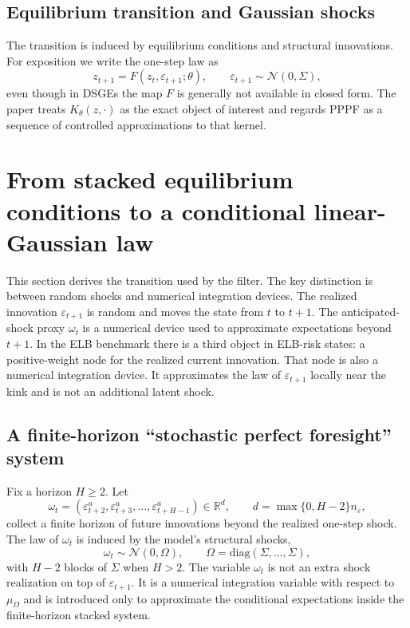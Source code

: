 \documentclass[11pt]{article}
\theoremstyle{remark}
\newcommand{\R}{\mathbb{R}}
\begin{document}
\subsection{Equilibrium transition and Gaussian shocks}

The transition is induced by equilibrium conditions and structural innovations.
For exposition we write the one-step law as
\begin{equation}
z_{t+1} = F(z_t,\varepsilon_{t+1};\theta),\qquad \varepsilon_{t+1}\sim \mathcal{N}(0,\Sigma),
\label{eq:true_transition}
\end{equation}
even though in DSGEs the map $F$ is generally not available in closed form.
The paper treats $K_\theta(z,\cdot)$ as the exact object of interest and regards PPPF as a sequence of controlled approximations to that kernel.

\section{From stacked equilibrium conditions to a conditional linear-Gaussian law}
\label{sec:cond_lg}

This section derives the transition used by the filter.
The key distinction is between random shocks and numerical integration devices.
The realized innovation $\varepsilon_{t+1}$ is random and moves the state from $t$ to $t+1$.
The anticipated-shock proxy $\omega_t$ is a numerical device used to approximate expectations beyond $t+1$.
In the ELB benchmark there is a third object in ELB-risk states: a positive-weight node for the realized current innovation.
That node is also a numerical integration device.
It approximates the law of $\varepsilon_{t+1}$ locally near the kink and is not an additional latent shock.

\subsection{A finite-horizon ``stochastic perfect foresight'' system}

Fix a horizon $H\ge 2$.
Let
\[
\omega_t = (\varepsilon_{t+2}^a,\varepsilon_{t+3}^a,\ldots,\varepsilon_{t+H-1}^a)\in \R^{d},
\qquad d=\max\{0,H-2\}n_\varepsilon,
\]
collect a finite horizon of future innovations beyond the realized one-step shock.
The law of $\omega_t$ is induced by the model's structural shocks,
\[
\omega_t \sim \mathcal{N}(0,\Omega),\qquad \Omega=\mathrm{diag}(\Sigma,\ldots,\Sigma),
\]
with $H-2$ blocks of $\Sigma$ when $H>2$.
The variable $\omega_t$ is not an extra shock realization on top of $\varepsilon_{t+1}$.
It is a numerical integration variable with respect to $\mu_\Omega$ and is introduced only to approximate the conditional expectations inside the finite-horizon stacked system.
\end{document}
